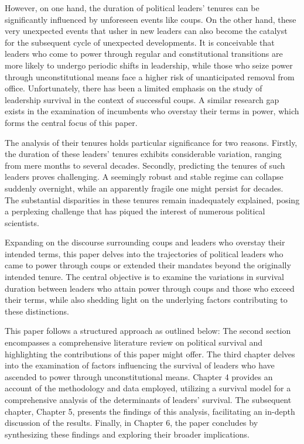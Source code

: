 \documentclass[
  12pt,
  a4paper,
  12pt]{article}
\begin{document}
However, on one hand, the duration of political leaders' tenures can be
significantly influenced by unforeseen events like coups. On the other
hand, these very unexpected events that usher in new leaders can also
become the catalyst for the subsequent cycle of unexpected developments.
It is conceivable that leaders who come to power through regular and
constitutional transitions are more likely to undergo periodic shifts in
leadership, while those who seize power through unconstitutional means
face a higher risk of unanticipated removal from office. Unfortunately,
there has been a limited emphasis on the study of leadership survival in
the context of successful coups. A similar research gap exists in the
examination of incumbents who overstay their terms in power, which forms
the central focus of this paper.

The analysis of their tenures holds particular significance for two
reasons. Firstly, the duration of these leaders' tenures exhibits
considerable variation, ranging from mere months to several decades.
Secondly, predicting the tenures of such leaders proves challenging. A
seemingly robust and stable regime can collapse suddenly overnight,
while an apparently fragile one might persist for decades. The
substantial disparities in these tenures remain inadequately explained,
posing a perplexing challenge that has piqued the interest of numerous
political scientists.

Expanding on the discourse surrounding coups and leaders who overstay
their intended terms, this paper delves into the trajectories of
political leaders who came to power through coups or extended their
mandates beyond the originally intended tenure. The central objective is
to examine the variations in survival duration between leaders who
attain power through coups and those who exceed their terms, while also
shedding light on the underlying factors contributing to these
distinctions.

This paper follows a structured approach as outlined below: The second
section encompasses a comprehensive literature review on political
survival and highlighting the contributions of this paper might offer.
The third chapter delves into the examination of factors influencing the
survival of leaders who have ascended to power through unconstitutional
means. Chapter 4 provides an account of the methodology and data
employed, utilizing a survival model for a comprehensive analysis of the
determinants of leaders' survival. The subsequent chapter, Chapter 5,
presents the findings of this analysis, facilitating an in-depth
discussion of the results. Finally, in Chapter 6, the paper concludes by
synthesizing these findings and exploring their broader implications.
\end{document}
